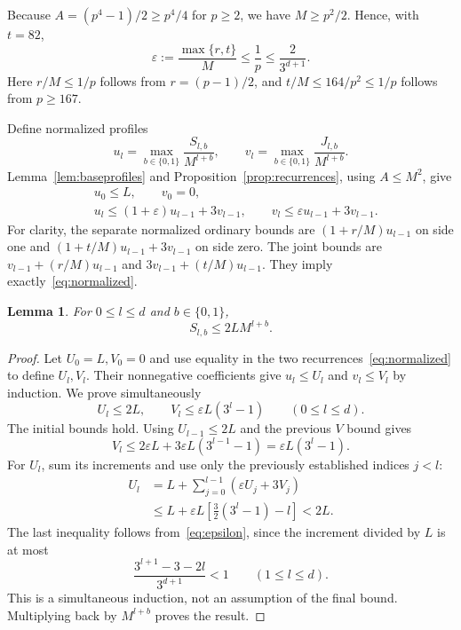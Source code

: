 \documentclass[11pt]{article}
\newtheorem{lemma}[theorem]{Lemma}
\theoremstyle{definition}
\newcommand{\bits}{\{0,1\}}
\begin{document}
Because $A=(p^4-1)/2\ge p^4/4$ for $p\ge2$, we have $M\ge p^2/2$. Hence, with $t=82$,
\begin{equation}\label{eq:epsilon}
 \varepsilon:=\frac{\max\{r,t\}}M
 \le\frac1p\le\frac{2}{3^{d+1}}.
\end{equation}
Here $r/M\le1/p$ follows from $r=(p-1)/2$, and $t/M\le164/p^2\le1/p$ follows from $p\ge167$.

Define normalized profiles
\[
 u_l=\max_{b\in\bits}\frac{S_{l,b}}{M^{l+b}},\qquad
 v_l=\max_{b\in\bits}\frac{J_{l,b}}{M^{l+b}}.
\]
Lemma~\ref{lem:baseprofiles} and Proposition~\ref{prop:recurrences}, using $A\le M^2$, give
\begin{align}
 &u_0\le L,\qquad v_0=0,\label{eq:initial}\\
 &u_l\le(1+\varepsilon)u_{l-1}+3v_{l-1},\qquad
 v_l\le\varepsilon u_{l-1}+3v_{l-1}.\label{eq:normalized}
\end{align}
For clarity, the separate normalized ordinary bounds are $(1+r/M)u_{l-1}$ on side one and $(1+t/M)u_{l-1}+3v_{l-1}$ on side zero. The joint bounds are $v_{l-1}+(r/M)u_{l-1}$ and $3v_{l-1}+(t/M)u_{l-1}$. They imply exactly~\eqref{eq:normalized}.

\begin{lemma}\label{lem:profiles}
For $0\le l\le d$ and $b\in\bits$,
\[
 S_{l,b}\le2L M^{l+b}.
\]
\end{lemma}
\begin{proof}
Let $U_0=L,V_0=0$ and use equality in the two recurrences~\eqref{eq:normalized} to define $U_l,V_l$. Their nonnegative coefficients give $u_l\le U_l$ and $v_l\le V_l$ by induction. We prove simultaneously
\[
 U_l\le2L,\qquad V_l\le\varepsilon L(3^l-1)\qquad(0\le l\le d).
\]
The initial bounds hold. Using $U_{l-1}\le2L$ and the previous $V$ bound gives
\[
 V_l\le2\varepsilon L+3\varepsilon L(3^{l-1}-1)
 =\varepsilon L(3^l-1).
\]
For $U_l$, sum its increments and use only the previously established indices $j<l$:
\begin{align*}
 U_l
 &=L+\sum_{j=0}^{l-1}(\varepsilon U_j+3V_j)\\
 &\le L+\varepsilon L\left[\frac32(3^l-1)-l\right]
 <2L.
\end{align*}
The last inequality follows from~\eqref{eq:epsilon}, since the increment divided by $L$ is at most
\[
 \frac{3^{l+1}-3-2l}{3^{d+1}}<1\qquad(1\le l\le d).
\]
This is a simultaneous induction, not an assumption of the final bound. Multiplying back by $M^{l+b}$ proves the result.
\end{proof}
\end{document}
